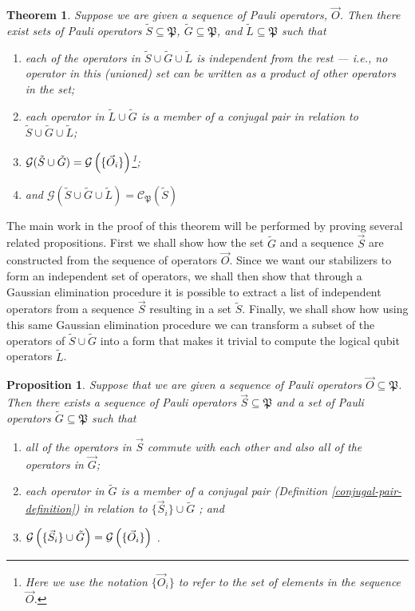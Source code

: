\documentclass[twocolumn,showpacs,preprintnumbers,amsmath,amssymb,nofootinbib,pra,floatfix]{revtex4}
\newtheorem{theorem}{Theorem}
\newtheorem{proposition}{Proposition}
\newenvironment{remark}[1][Remark]{\begin{trivlist}
\item[\hskip \labelsep {\bfseries #1}]}{\end{trivlist}}
\newcommand{\lst}{\vec}
\newcommand{\set}{\tilde}
\newcommand{\genfun}{\mathcal{G}}
\newcommand{\pauligroup}{\mathfrak{P}}
\newcommand{\centralizer}{\mathcal{C}}
\begin{document}
\begin{theorem} \label{theorem-SG} Suppose we are given a sequence of Pauli operators, $\lst O$.  Then there exist sets of Pauli operators $\set S\subseteq\pauligroup$, $\set G\subseteq\pauligroup$, and $\set L\subseteq\pauligroup$ such that
\begin{enumerate}
\item each of the operators in $\set S \cup \set G \cup \set L$ is independent from the rest --- i.e., no operator in this (unioned) set can be written as a product of other operators in the set;
\item each operator in $\set L \cup \set G$ is a member of a conjugal pair in relation to $\set S \cup \set G \cup \set L$;
\item $\genfun(\set S \cup \set G)=\genfun\paren{\{\lst O_i\}}$\footnote{Here we use the notation $\{\vec{O}_i\}$ to refer to the set of elements in the sequence $\vec{O}$.};
\item and $\genfun(\set S \cup \set G \cup \set L)=\centralizer_\pauligroup(\set S)$
\end{enumerate}
\end{theorem}

\begin{remark}
The main work in the proof of this theorem will be performed by proving several related propositions.  First we shall show how the set $\set G$ and a sequence $\lst S$ are constructed from the sequence of operators $\lst O$.  Since we want our stabilizers to form an independent set of operators, we shall then show that through a Gaussian elimination procedure it is possible to extract a list of independent operators from a sequence $\lst S$ resulting in a set $\set S$.  Finally, we shall show how using this same Gaussian elimination procedure we can transform a subset of the operators of $\set S\cup\set G$ into a form that makes it trivial to compute the logical qubit operators $\set L$.
\end{remark}
\begin{proposition} \label{proposition-SG} Suppose that we are given a sequence of Pauli operators $\lst O\subseteq \pauligroup$.  Then there exists a sequence of Pauli operators $\lst S\subseteq\pauligroup$ and a set of Pauli operators $\set G\subseteq\pauligroup$ such that
\begin{enumerate}
\item all of the operators in $\lst S$ commute with each other and also all of the operators in $\lst G$; \label{stabs-commute-with-G}
\item each operator in $\set G$ is a member of a \emph{conjugal pair} (Definition \ref{conjugal-pair-definition}) in relation to $\{\lst S_i\} \cup \set G $ \label{conjugal-pairs-commute-with-SAG}; and
\item $\genfun\paren{\{\lst S_i\}\cup \set G}=\genfun\paren{\{\lst O_i\}}$ \label{SAG-spans-all}.
\end{enumerate}
\end{proposition}
\end{document}
